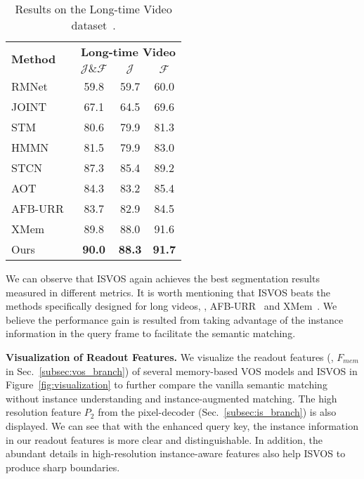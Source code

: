 \documentclass[10pt,twocolumn,letterpaper]{article}
\newcommand{\system}{ISVOS\xspace}
\begin{document}
\begin{table}[!ht]
\centering
  \setlength{\tabcolsep}{0pt}
  \begin{tabular*}{0.9\linewidth}{@{\extracolsep{\fill}}l | ccc }
    \toprule
    \multirow{2}{1in}{\textbf{Method}} & \multicolumn{3}{c}{\textbf{Long-time Video}}  \\
    ~ & $\mathcal{J\&F}$ & $\mathcal{J}$ & $\mathcal{F}$ \\
    \midrule
    RMNet~\cite{xie2021efficient} & 59.8 & 59.7 & 60.0 \\
    JOINT~\cite{mao2021joint} & 67.1 & 64.5 & 69.6 \\
    STM~\cite{oh2019video} & 80.6 & 79.9 & 81.3 \\ 
    HMMN~\cite{shi2015hierarchical} & 81.5 & 79.9 & 83.0 \\
    STCN~\cite{cheng2021stcn} & 87.3 & 85.4 & 89.2  \\
    AOT~\cite{yang2021associating} & 84.3 & 83.2 & 85.4 \\
    AFB-URR~\cite{liang2020video} & 83.7 & 82.9 &  84.5 \\
    XMem~\cite{cheng2022xmem} & 89.8 & 88.0 & 91.6 \\
    Ours & \textbf{90.0} & \textbf{88.3} & \textbf{91.7} \\
    \bottomrule
  \end{tabular*}
 \caption{Results on the Long-time Video dataset~\cite{liang2020video}. }
\label{tab:long}
\end{table}

We can observe that \system again achieves the best segmentation results measured in different metrics. It is worth mentioning that \system beats the methods specifically designed for long videos, \eg, AFB-URR~\cite{liang2020video} and XMem~\cite{cheng2022xmem}. We believe the performance gain is resulted from taking advantage of the instance information in the query frame to facilitate the semantic matching.

\vspace{0.05in}
\noindent \textbf{Visualization of Readout Features.} We visualize the readout features (\ie, $F_{mem}$ in Sec.~\ref{subsec:vos_branch}) of several memory-based VOS models and \system in Figure~\ref{fig:visualization} to further compare the vanilla semantic matching without instance understanding and instance-augmented matching. The high resolution feature $P_{2}$ from the pixel-decoder (Sec.~\ref{subsec:is_branch}) is also displayed. We can see that with the enhanced query key, the instance information in our readout features is more clear and distinguishable. In addition, the abundant details in high-resolution instance-aware features also help \system to produce sharp boundaries.
\end{document}
